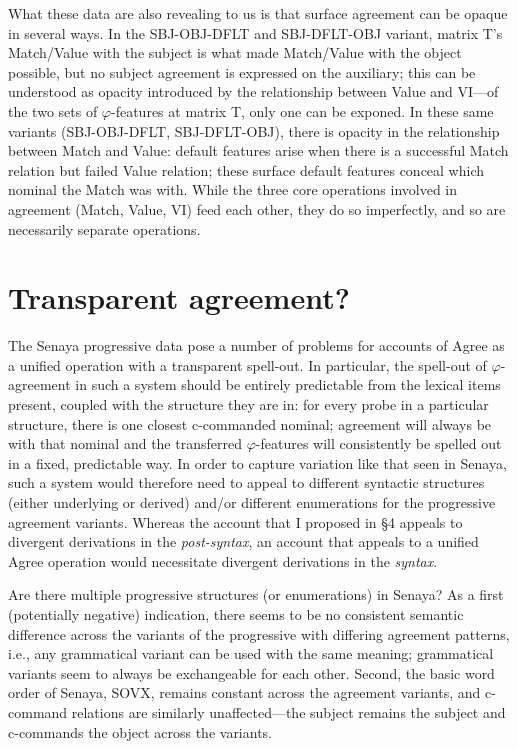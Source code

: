 \documentclass[output=paper
,modfonts
,nonflat]{langsci/langscibook}
\begin{document}
What these data are also revealing to us is that surface agreement can be opaque in several ways. In the SBJ-OBJ-DFLT  and SBJ-DFLT-OBJ variant, matrix T's Match/Value with the subject is what made Match/Value with the object possible, but no subject agreement is expressed on the auxiliary; this can be understood as opacity introduced by the relationship between Value and VI---of the two sets of $\varphi$-features at matrix T, only one can be exponed. In these same variants (SBJ-OBJ-DFLT, SBJ-DFLT-OBJ), there is opacity in the relationship between Match and Value: default features arise when there is a successful Match relation but failed Value relation; these surface default features conceal which nominal the Match was with. While the three core operations involved in agreement (Match, Value, VI) feed each other, they do so imperfectly, and so are necessarily separate operations.

\section{Transparent agreement?}

The Senaya progressive data pose a number of problems for accounts of Agree as a unified operation with a transparent spell-out. In particular, the spell-out of $\varphi$-agreement in such a system should be entirely predictable from the lexical items present, coupled with the structure they are in: for every probe in a particular structure, there is one closest c-commanded nominal; agreement will always be with that nominal and the transferred $\varphi$-features will consistently be spelled out in a fixed, predictable way. In order to capture variation like that seen in Senaya, such a system would therefore need to appeal to different syntactic structures (either underlying or derived) and/or different enumerations for the progressive agreement variants. Whereas the account that I proposed in \S4 appeals to divergent derivations in the \textit{post-syntax}, an account that appeals to a unified Agree operation would necessitate divergent derivations in the \textit{syntax}.

Are there multiple progressive structures (or enumerations) in Senaya? As a first (potentially negative) indication, there seems to be no consistent semantic difference  across the variants of the progressive with differing agreement patterns, i.e., any grammatical variant can be used with the same meaning; grammatical variants seem to always be exchangeable for each other. Second, the basic word order of Senaya, SOVX, remains constant across the agreement variants, and c-command relations are similarly unaffected---the subject remains the subject and c-commands the object across the variants.
\end{document}
